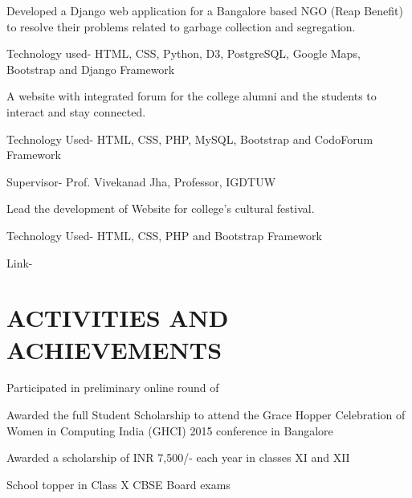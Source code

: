 \documentclass[]{resume-openfont}
\begin{document}
\begin{minipage}[t]{0.66\textwidth}
Developed a Django web application for a Bangalore based NGO (Reap Benefit) to resolve their problems related to garbage collection and segregation. \\
\begin{tightemize}
\item Technology used- HTML, CSS, Python, D3, PostgreSQL, Google Maps, Bootstrap and Django Framework
\end{tightemize}
\sectionsep

A website with integrated forum for the college alumni and the students to interact and stay connected.
\begin{tightemize}
\item Technology Used- HTML, CSS, PHP, MySQL, Bootstrap and CodoForum Framework
\item Supervisor- Prof. Vivekanad Jha, Professor, IGDTUW
\end{tightemize}
\sectionsep

Lead the development of Website for college’s cultural festival. 
\begin{tightemize}
\item Technology Used- HTML, CSS, PHP and Bootstrap Framework
\item Link- \href{http://www.taarangana.com/}{}
\end{tightemize}

\sectionsep


\section{ACTIVITIES AND ACHIEVEMENTS}

\begin{tightemize}
\item {}
\item Participated in preliminary online round of 
\item Awarded the full Student Scholarship to attend the Grace Hopper Celebration of Women in Computing India (GHCI) 2015 conference in Bangalore
\item Awarded a scholarship of INR 7,500/-  each year in classes XI and XII
\item School topper in Class X CBSE Board exams
\end{tightemize}
\sectionsep


\end{minipage}
\end{document}
